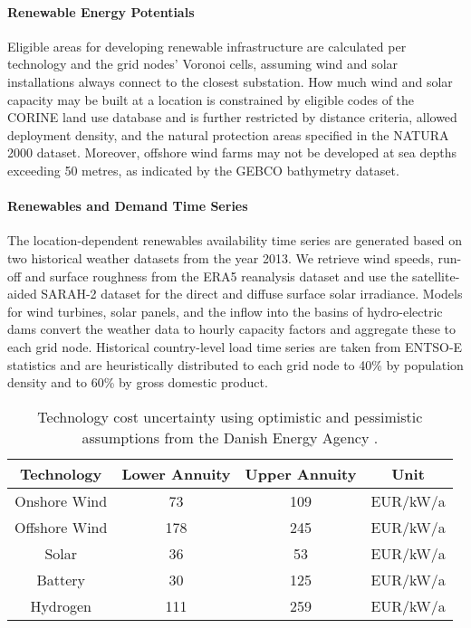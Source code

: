 
\paragraph{Renewable Energy Potentials}
Eligible areas for developing renewable infrastructure are calculated
per technology and the grid nodes' Voronoi cells, assuming wind and solar installations always connect to the closest substation.
How much wind and solar capacity may be built at a location is constrained by
eligible codes of the CORINE land use database and is further restricted by distance criteria,
allowed deployment density, and the natural protection areas specified in the NATURA 2000 dataset.
Moreover, offshore wind farms may not be developed at sea depths exceeding 50 metres,
as indicated by the GEBCO bathymetry dataset.


\paragraph{Renewables and Demand Time Series}
The location-dependent renewables availability time series are generated
based on two historical weather datasets from the year 2013.
We retrieve wind speeds, run-off and surface roughness from the ERA5 reanalysis dataset and
use the satellite-aided SARAH-2 dataset for the direct and diffuse surface solar irradiance.
Models for wind turbines, solar panels, and the inflow into the basins of hydro-electric dams
convert the weather data to hourly capacity factors and aggregate these to each grid node.
Historical country-level load time series are taken from ENTSO-E statistics and are
heuristically distributed to each grid node to 40\% by population density and to 60\% by gross domestic product.



\begin{SCtable}
    \begin{small}
        \begin{tabular}{cccc}
            \toprule
            Technology & Lower Annuity & Upper Annuity & Unit  \\ \midrule
            Onshore Wind & 73 & 109 & EUR/kW/a \\
            Offshore Wind & 178 & 245 & EUR/kW/a \\ %
            Solar & 36 & 53 & EUR/kW/a \\
            Battery & 30 & 125 & EUR/kW/a \\
            Hydrogen & 111 & 259 & EUR/kW/a \\ \bottomrule
        \end{tabular}
    \end{small}
    \caption[Technology Cost Uncertainty]{Technology cost uncertainty using optimistic and pessimistic assumptions from the Danish Energy Agency \cite{DEA}.}
    \label{tab:costuncertainty}
\end{SCtable}

